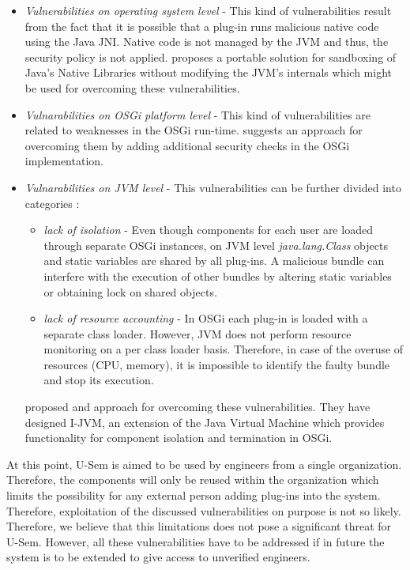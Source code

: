 \begin{itemize}

	\item \textit{Vulnerabilities on operating system level} - This kind of vulnerabilities result from the fact that it is possible that a plug-in runs malicious native code using the Java JNI. Native code is not managed by the JVM and thus, the security policy is not applied. \cite{sun2012jvm} proposes a portable solution for sandboxing of Java's Native Libraries without modifying the JVM's internals which might be used for overcoming these vulnerabilities.
	
	\item \textit{Vulnarabilities on OSGi platform level} - This kind of vulnerabilities are related to weaknesses in the OSGi run-time. \cite{parrend2009security} suggests an approach for overcoming them by adding additional security checks in the OSGi implementation.
	
	\item \textit{Vulnarabilities on JVM level} - This vulnerabilities can be further divided into categories \cite{geoffray2009jvm}: 
	
	\begin{itemize}
		\item \textit{lack of isolation} - Even though components for each user are loaded through separate OSGi instances, on JVM level \textit{java.lang.Class} objects and static variables are shared by all plug-ins. A malicious bundle can interfere with the execution of other bundles by altering static variables or obtaining lock on shared objects.
		
		\item \textit{lack of resource accounting} - In OSGi each plug-in is loaded with a separate class loader. However, JVM does not perform resource monitoring on a per class loader basis. Therefore, in case of the overuse of resources (CPU, memory), it is impossible to identify the faulty bundle and stop its execution.
		
	\end{itemize}
	
	\cite{geoffray2009jvm} proposed and approach for overcoming these vulnerabilities. They have designed I-JVM, an extension of the Java Virtual Machine which provides functionality for component isolation and termination in OSGi.
	
\end{itemize}

At this point, U-Sem is aimed to be used by engineers from a single organization. Therefore, the components will only be reused within the organization which limits the possibility for any external person adding plug-ins into the system. Therefore, exploitation of the discussed vulnerabilities on purpose is not so likely. Therefore, we believe that this limitations does not pose a significant threat for U-Sem. However, all these vulnerabilities have to be addressed if in future the system is to be extended to give access to unverified engineers. 

